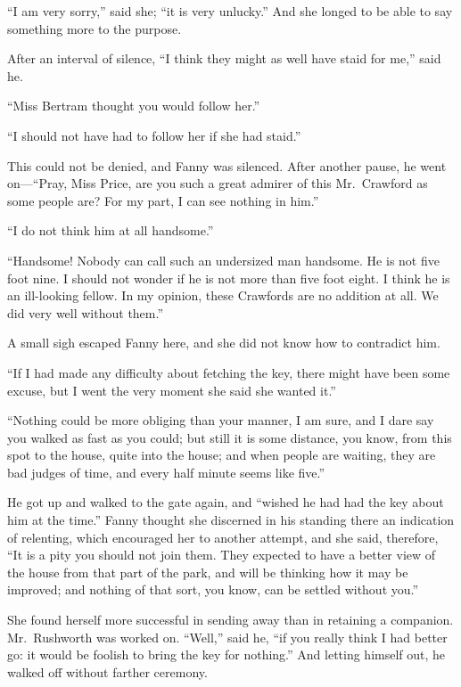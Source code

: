 \documentclass{article}
\begin{document}
``I am very sorry,'' said she; ``it is very unlucky.''  And she
longed to be able to say something more to the purpose.

After an interval of silence, ``I think they might as well
have staid for me,'' said he.

``Miss Bertram thought you would follow her.''

``I should not have had to follow her if she had staid.''

This could not be denied, and Fanny was silenced.
After another pause, he went on---``Pray, Miss Price,
are you such a great admirer of this Mr.\ Crawford as some
people are?  For my part, I can see nothing in him.''

``I do not think him at all handsome.''

``Handsome!  Nobody can call such an undersized man handsome.
He is not five foot nine.  I should not wonder if he is not more
than five foot eight.  I think he is an ill-looking fellow.
In my opinion, these Crawfords are no addition at all.
We did very well without them.''

A small sigh escaped Fanny here, and she did not know
how to contradict him.

``If I had made any difficulty about fetching the key,
there might have been some excuse, but I went the very
moment she said she wanted it.''

``Nothing could be more obliging than your manner, I am sure,
and I dare say you walked as fast as you could; but still
it is some distance, you know, from this spot to the house,
quite into the house; and when people are waiting,
they are bad judges of time, and every half minute seems
like five.''

He got up and walked to the gate again, and ``wished he
had had the key about him at the time.''  Fanny thought she
discerned in his standing there an indication of relenting,
which encouraged her to another attempt, and she said,
therefore, ``It is a pity you should not join them.
They expected to have a better view of the house from
that part of the park, and will be thinking how it
may be improved; and nothing of that sort, you know,
can be settled without you.''

She found herself more successful in sending away than
in retaining a companion.  Mr.\ Rushworth was worked on.
``Well,'' said he, ``if you really think I had better go:
it would be foolish to bring the key for nothing.''
And letting himself out, he walked off without farther
ceremony.
\end{document}
